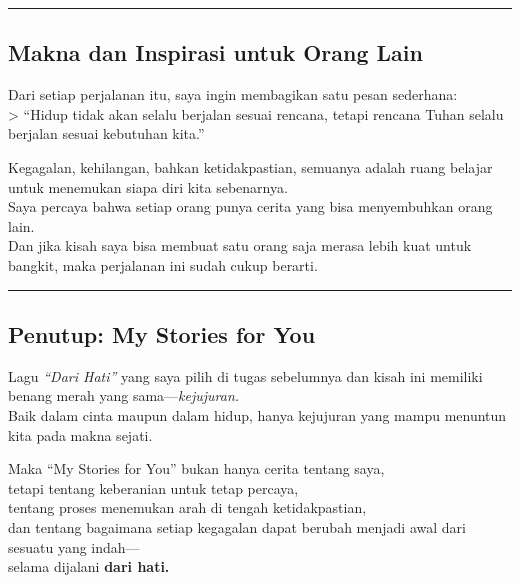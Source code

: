 \documentclass[
  letterpaper,
  DIV=11,
  numbers=noendperiod]{scrreprt}
\begin{document}
\begin{center}\rule{0.5\linewidth}{0.5pt}\end{center}

\subsection{\texorpdfstring{\textbf{Makna dan Inspirasi untuk Orang
Lain}}{Makna dan Inspirasi untuk Orang Lain}}\label{makna-dan-inspirasi-untuk-orang-lain}

Dari setiap perjalanan itu, saya ingin membagikan satu pesan
sederhana:\\
\textgreater{} ``Hidup tidak akan selalu berjalan sesuai rencana, tetapi
rencana Tuhan selalu berjalan sesuai kebutuhan kita.''

Kegagalan, kehilangan, bahkan ketidakpastian, semuanya adalah ruang
belajar untuk menemukan siapa diri kita sebenarnya.\\
Saya percaya bahwa setiap orang punya cerita yang bisa menyembuhkan
orang lain.\\
Dan jika kisah saya bisa membuat satu orang saja merasa lebih kuat untuk
bangkit, maka perjalanan ini sudah cukup berarti.

\begin{center}\rule{0.5\linewidth}{0.5pt}\end{center}

\subsection{\texorpdfstring{\textbf{Penutup: My Stories for
You}}{Penutup: My Stories for You}}\label{penutup-my-stories-for-you}

Lagu \emph{``Dari Hati''} yang saya pilih di tugas sebelumnya dan kisah
ini memiliki benang merah yang sama---\emph{kejujuran.}\\
Baik dalam cinta maupun dalam hidup, hanya kejujuran yang mampu menuntun
kita pada makna sejati.

Maka ``My Stories for You'' bukan hanya cerita tentang saya,\\
tetapi tentang keberanian untuk tetap percaya,\\
tentang proses menemukan arah di tengah ketidakpastian,\\
dan tentang bagaimana setiap kegagalan dapat berubah menjadi awal dari
sesuatu yang indah---\\
selama dijalani \textbf{dari hati.}

\end{document}
